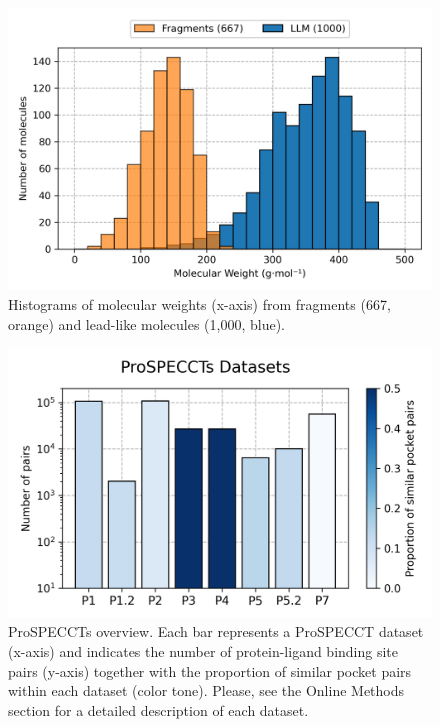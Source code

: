 \begin{figure}[htbp]
  \centering
  \includegraphics[width=0.65\linewidth]{figures/PocketVec/Supplementary/FigS2.png}
  \caption{
  Histograms of molecular weights (x-axis) from fragments (667, orange) and lead-like molecules (1,000, blue).
  }
  \label{FigS2}
\end{figure}


\begin{figure}[htbp]
  \centering
  \includegraphics[width=0.75\linewidth]{figures/PocketVec/Supplementary/FigS3.png}
  \caption{
  ProSPECCTs overview. Each bar represents a ProSPECCT dataset (x-axis) and indicates the number of protein-ligand binding site pairs (y-axis) together with the proportion of similar pocket pairs within each dataset (color tone). Please, see the Online Methods section for a detailed description of each dataset.
  }
  \label{FigS3}
\end{figure}


